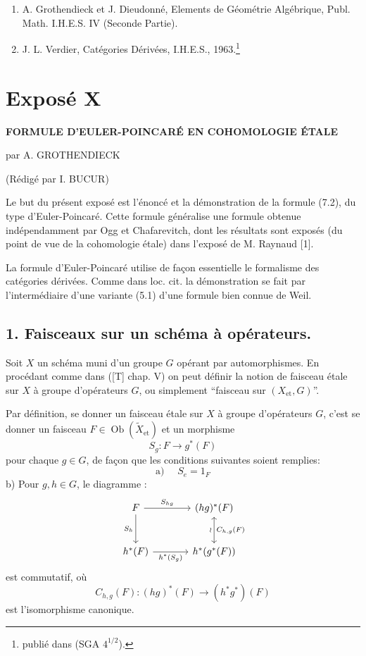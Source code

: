 \documentclass[11pt]{article}
\providecommand{\EP}{\operatorname{EP}}
\providecommand{\Ob}{\operatorname{ob}}
\providecommand{\Ob}{\operatorname{ob}}
\providecommand{\EP}{\operatorname{EP}}
\providecommand{\Ob}{\operatorname{Ob}}
\providecommand{\Ob}{\operatorname{ob}}
\providecommand{\Ob}{\operatorname{Ob}}
\begin{document}
\begin{enumerate}
\item[{[1]}] A. Grothendieck et J. Dieudonné, Elements de Géométrie Algébrique, Publ. Math. I.H.E.S. IV (Seconde Partie).
\item[{[2]}] J. L. Verdier, Catégories Dérivées, I.H.E.S., 1963.\footnote{publié dans (SGA $4^{1/2}$).}
\end{enumerate}

\renewcommand{\Ob}{\operatorname{ob}}
\section*{Exposé X}
\renewcommand{\EP}{\operatorname{\mathbb{EP}}}
\renewcommand{\Ob}{\operatorname{Ob}}

\begin{center}
\textbf{FORMULE D'EULER-POINCARÉ EN COHOMOLOGIE ÉTALE}

par A. GROTHENDIECK

(Rédigé par I. BUCUR)
\end{center}

Le but du présent exposé est l'énoncé et la démonstration de la formule (7.2), du type d'Euler-Poincaré. Cette formule généralise une formule obtenue indépendamment par Ogg et Chafarevitch, dont les résultats sont exposés (du point de vue de la cohomologie étale) dans l'exposé de M. Raynaud [1].

La formule d'Euler-Poincaré utilise de façon essentielle le formalisme des catégories dérivées. Comme dans loc. cit. la démonstration se fait par l'intermédiaire d'une variante (5.1) d'une formule bien connue de Weil.

\subsection*{1. Faisceaux sur un schéma à opérateurs.}

Soit $X$ un schéma muni d'un groupe $G$ opérant par automorphismes. En procédant comme dans ([T] chap. V) on peut définir la notion de faisceau étale sur $X$ à groupe d'opérateurs $G$, ou simplement ``faisceau sur $(X_{\mathrm{et}},G)$''.

Par définition, se donner un faisceau étale sur $X$ à groupe d'opérateurs $G$, c'est se donner un faisceau $F\in \operatorname{Ob}(\widetilde X_{\mathrm{et}})$ et un morphisme
\[
S_g:F\longrightarrow g^*(F)
\]
pour chaque $g\in G$, de façon que les conditions suivantes soient remplies:
\[
\text{a) }\quad S_e=1_F
\]
b) Pour $g,h\in G$, le diagramme :
\[
\begin{tikzcd}[column sep=large,row sep=large]
F \arrow[r,"S_{hg}"] \arrow[d,"S_h"'] & (hg)^*(F) \arrow[d,leftrightarrow,"\wr"',"C_{h,g}(F)"]\\
h^*(F) \arrow[r,"h^*(S_g)"'] & h^*(g^*(F))
\end{tikzcd}
\]
est commutatif, où
\[
C_{h,g}(F):(hg)^*(F)\longrightarrow (h^*g^*)(F)
\]
est l'isomorphisme canonique.
\end{document}
